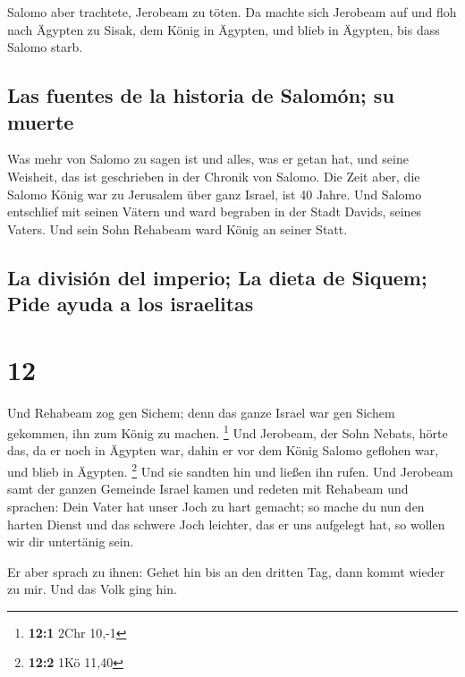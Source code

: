  Salomo aber trachtete, Jerobeam zu töten. Da machte sich
Jerobeam auf und floh nach Ägypten zu Sisak, dem König in Ägypten, und
blieb in Ägypten, bis dass Salomo starb.

\hypertarget{las-fuentes-de-la-historia-de-salomuxf3n-su-muerte}{%
\subsection{Las fuentes de la historia de Salomón; su
muerte}\label{las-fuentes-de-la-historia-de-salomuxf3n-su-muerte}}

 Was mehr von Salomo zu sagen ist und alles, was er getan
hat, und seine Weisheit, das ist geschrieben in der Chronik von Salomo.
 Die Zeit aber, die Salomo König war zu Jerusalem über
ganz Israel, ist 40 Jahre.  Und Salomo entschlief mit
seinen Vätern und ward begraben in der Stadt Davids, seines Vaters. Und
sein Sohn Rehabeam ward König an seiner Statt.

\hypertarget{la-divisiuxf3n-del-imperio-la-dieta-de-siquem-pide-ayuda-a-los-israelitas}{%
\subsection{La división del imperio; La dieta de Siquem; Pide ayuda a
los
israelitas}\label{la-divisiuxf3n-del-imperio-la-dieta-de-siquem-pide-ayuda-a-los-israelitas}}

\hypertarget{section-11}{%
\section{12}\label{section-11}}

 Und Rehabeam zog gen Sichem; denn das ganze Israel war
gen Sichem gekommen, ihn zum König zu machen. \footnote{\textbf{12:1}
  2Chr 10,-1}  Und Jerobeam, der Sohn Nebats, hörte das,
da er noch in Ägypten war, dahin er vor dem König Salomo geflohen war,
und blieb in Ägypten. \footnote{\textbf{12:2} 1Kö 11,40} 
Und sie sandten hin und ließen ihn rufen. Und Jerobeam samt der ganzen
Gemeinde Israel kamen und redeten mit Rehabeam und sprachen:
 Dein Vater hat unser Joch zu hart gemacht; so mache du
nun den harten Dienst und das schwere Joch leichter, das er uns
aufgelegt hat, so wollen wir dir untertänig sein.

 Er aber sprach zu ihnen: Gehet hin bis an den dritten
Tag, dann kommt wieder zu mir. Und das Volk ging hin.


